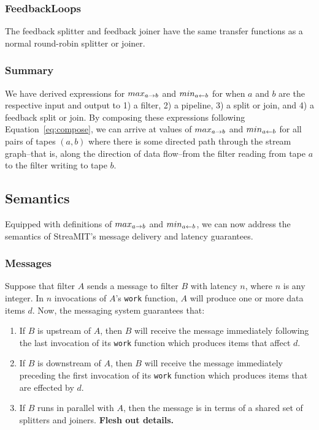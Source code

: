 \subsubsection{FeedbackLoops}

The feedback splitter and feedback joiner have the same transfer
functions as a normal round-robin splitter or joiner.

\subsubsection{Summary}

We have derived expressions for $max_{a \rightarrow b}$ and $min_{a \leftarrow b}$ for when
$a$ and $b$ are the respective input and output to 1) a filter, 2) a
pipeline, 3) a split or join, and 4) a feedback split or join.  By
composing these expressions following Equation~\ref{eq:compose}, we
can arrive at values of $max_{a \rightarrow b}$ and $min_{a \leftarrow b}$ for all pairs of
tapes $(a, b)$ where there is some directed path through the stream
graph--that is, along the direction of data flow--from the filter
reading from tape $a$ to the filter writing to tape $b$.

\subsection{Semantics}

Equipped with definitions of $max_{a \rightarrow b}$ and $min_{a \leftarrow b}$, we can now
address the semantics of StreaMIT's message delivery and latency
guarantees.

\subsubsection{Messages}

Suppose that filter $A$ sends a message to filter $B$ with latency
$n$, where $n$ is any integer.  In $n$ invocations of $A$'s {\tt work}
function, $A$ will produce one or more data items $d$.  Now, the
messaging system guarantees that:

\begin{enumerate}

\item If $B$ is upstream of $A$, then $B$ will receive the message
immediately following the last invocation of its {\tt work} function
which produces items that affect $d$.

\item If $B$ is downstream of $A$, then $B$ will receive the message
immediately preceding the first invocation of its {\tt work} function
which produces items that are effected by $d$.

\item If $B$ runs in parallel with $A$, then the message is in terms
of a shared set of splitters and joiners.  {\bf Flesh out details.}

\end{enumerate}

